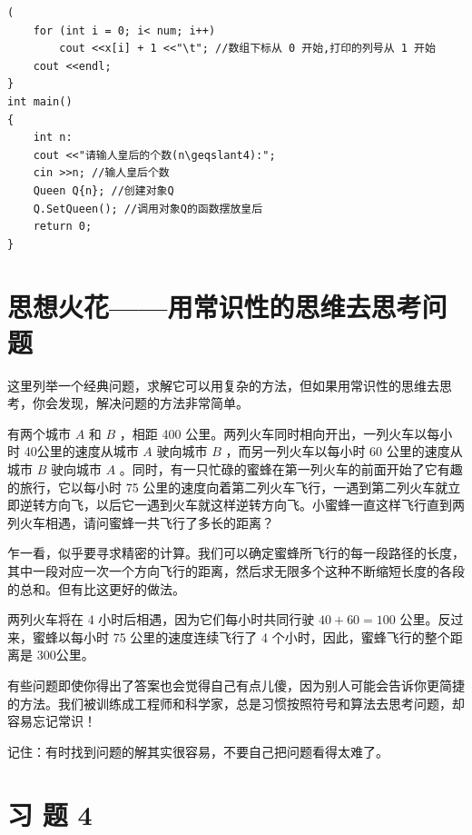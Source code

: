\documentclass[10pt]{article}
\begin{document}
\begin{verbatim}
( 
    for (int i = 0; i< num; i++)
        cout <<x[i] + 1 <<"\t"; //数组下标从 0 开始,打印的列号从 1 开始
    cout <<endl;
}
int main()
{
    int n:
    cout <<"请输人皇后的个数(n\geqslant4):";
    cin >>n; //输人皇后个数
    Queen Q{n}; //创建对象Q
    Q.SetQueen(); //调用对象Q的函数摆放皇后
    return 0;
}
\end{verbatim}

\section*{思想火花——用常识性的思维去思考问题}
这里列举一个经典问题，求解它可以用复杂的方法，但如果用常识性的思维去思考，你会发现，解决问题的方法非常简单。

有两个城市 $A$ 和 $B$ ，相距 400 公里。两列火车同时相向开出，一列火车以每小时 40公里的速度从城市 $A$ 驶向城市 $B$ ，而另一列火车以每小时 60 公里的速度从城市 $B$ 驶向城市 $A$ 。同时，有一只忙碌的蜜蜂在第一列火车的前面开始了它有趣的旅行，它以每小时 75 公里的速度向着第二列火车飞行，一遇到第二列火车就立即逆转方向飞，以后它一遇到火车就这样逆转方向飞。小蜜蜂一直这样飞行直到两列火车相遇，请问蜜蜂一共飞行了多长的距离？

乍一看，似乎要寻求精密的计算。我们可以确定蜜蜂所飞行的每一段路径的长度，其中一段对应一次一个方向飞行的距离，然后求无限多个这种不断缩短长度的各段的总和。但有比这更好的做法。

两列火车将在 4 小时后相遇，因为它们每小时共同行驶 $40+60=100$ 公里。反过来，蜜蜂以每小时 75 公里的速度连续飞行了 4 个小时，因此，蜜蜂飞行的整个距离是 300公里。

有些问题即使你得出了答案也会觉得自己有点儿傻，因为别人可能会告诉你更简捷的方法。我们被训练成工程师和科学家，总是习惯按照符号和算法去思考问题，却容易忘记常识！

记住：有时找到问题的解其实很容易，不要自己把问题看得太难了。

\section*{习 题 4}
\end{document}
